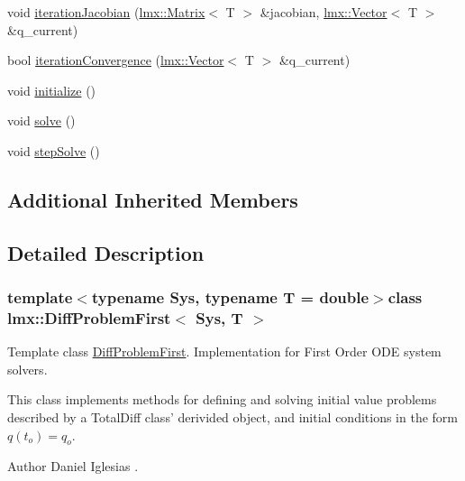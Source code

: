 \begin{DoxyCompactItemize}
\item 
void \hyperlink{classlmx_1_1DiffProblemFirst_a41a1e8c20fd4ef8aff4202f895be8b51}{iteration\-Jacobian} (\hyperlink{classlmx_1_1Matrix}{lmx\-::\-Matrix}$<$ T $>$ \&jacobian, \hyperlink{classlmx_1_1Vector}{lmx\-::\-Vector}$<$ T $>$ \&q\-\_\-current)
\item 
bool \hyperlink{classlmx_1_1DiffProblemFirst_afa938181b5a6cfeee0b9584ae22f1756}{iteration\-Convergence} (\hyperlink{classlmx_1_1Vector}{lmx\-::\-Vector}$<$ T $>$ \&q\-\_\-current)
\item 
void \hyperlink{classlmx_1_1DiffProblemFirst_ac08b98b65d0eabe6ab28536fa5ab14f7}{initialize} ()
\item 
void \hyperlink{classlmx_1_1DiffProblemFirst_a9f49697369b6d27dc281b17626ddcd54}{solve} ()
\item 
void \hyperlink{classlmx_1_1DiffProblemFirst_a95a3a5d4f23d727859f20f58b9f345ba}{step\-Solve} ()
\end{DoxyCompactItemize}
\subsection*{Additional Inherited Members}


\subsection{Detailed Description}
\subsubsection*{template$<$typename Sys, typename T = double$>$class lmx\-::\-Diff\-Problem\-First$<$ Sys, T $>$}

Template class \hyperlink{classlmx_1_1DiffProblemFirst}{Diff\-Problem\-First}. Implementation for First Order O\-D\-E system solvers. 

This class implements methods for defining and solving initial value problems described by a Total\-Diff class' derivided object, and initial conditions in the form $ q(t_o) = q_o $.

\begin{DoxyAuthor}{Author}
Daniel Iglesias . 
\end{DoxyAuthor}



